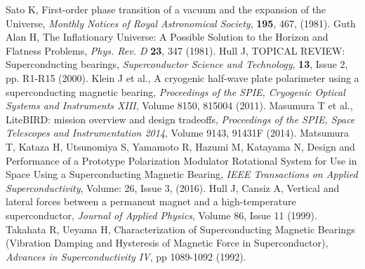 \documentclass[a4paper,11pt]{jpconf}
\begin{document}
\vspace*{5mm}
\begin{thebibliography}{99}

Sato K, First-order phase transition of a vacuum and the expansion of the Universe, {\it Monthly Notices of Royal Astronomical Society}, {\bf 195}, 467, (1981).
Guth Alan H, The Inflationary Universe: A Possible Solution to the Horizon and Flatness Problems, {\it Phys. Rev. D} {\bf 23}, 347 (1981).
Hull J, TOPICAL REVIEW: Superconducting bearings, {\it  Superconductor Science and Technology}, {\bf 13}, Issue 2, pp. R1-R15 (2000).
Klein J et al., A cryogenic half-wave plate polarimeter using a superconducting magnetic bearing, {\it Proceedings of the SPIE, Cryogenic Optical Systems and Instruments XIII}, Volume 8150, 815004 (2011).
Masumura T et al., LiteBIRD: mission overview and design tradeoffs, {\it Proceedings of the SPIE, Space Telescopes and Instrumentation 2014}, Volume 9143, 91431F (2014).
Matsumura T, Kataza H, Utsunomiya S, Yamamoto R, Hazumi M, Katayama N, Design and Performance of a Prototype Polarization Modulator Rotational System for Use in Space Using a Superconducting Magnetic Bearing, { \it IEEE Transactions on Applied Superconductivity}, Volume: 26, Issue 3, (2016).
Hull J, Cansiz A, Vertical and lateral forces between a permanent magnet and a high-temperature superconductor, {\it Journal of Applied Physics}, Volume 86, Issue 11 (1999).
Takahata R, Ueyama H, Characterization of Superconducting Magnetic Bearings (Vibration Damping and Hysteresis of Magnetic Force in Superconductor), {\it Advances in Superconductivity IV}, pp 1089-1092 (1992).

\end{thebibliography}
\end{document}
